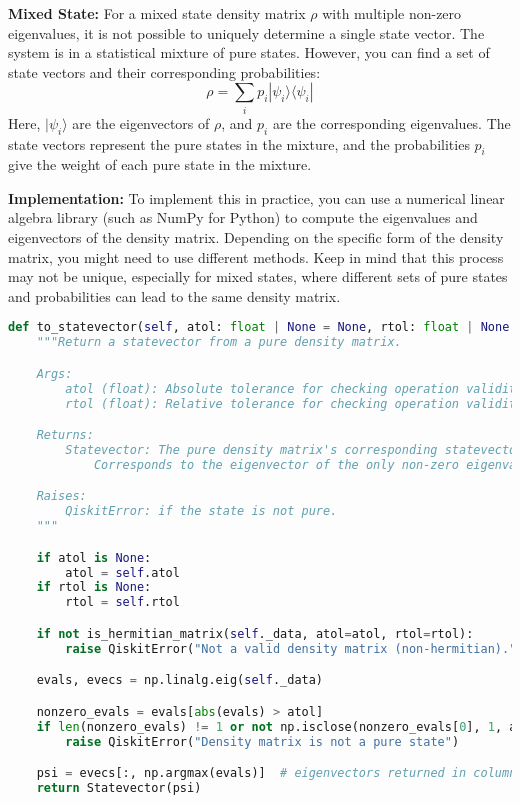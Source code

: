 \documentclass{article}
\begin{document}
\textbf{Mixed State:}
For a mixed state density matrix $\rho$ with multiple non-zero eigenvalues, it is not possible to uniquely determine a single state vector. The system is in a statistical mixture of pure states. However, you can find a set of state vectors and their corresponding probabilities:
\[ \rho = \sum_i p_i |\psi_i\rangle\langle\psi_i| \]
Here, $|\psi_i\rangle$ are the eigenvectors of $\rho$, and $p_i$ are the corresponding eigenvalues. The state vectors represent the pure states in the mixture, and the probabilities $p_i$ give the weight of each pure state in the mixture.

\textbf{Implementation:}
To implement this in practice, you can use a numerical linear algebra library (such as NumPy for Python) to compute the eigenvalues and eigenvectors of the density matrix. Depending on the specific form of the density matrix, you might need to use different methods.
Keep in mind that this process may not be unique, especially for mixed states, where different sets of pure states and probabilities can lead to the same density matrix.

\newpage
\begin{lstlisting}[language=Python]
def to_statevector(self, atol: float | None = None, rtol: float | None = None) -> Statevector:
    """Return a statevector from a pure density matrix.

    Args:
        atol (float): Absolute tolerance for checking operation validity.
        rtol (float): Relative tolerance for checking operation validity.

    Returns:
        Statevector: The pure density matrix's corresponding statevector.
            Corresponds to the eigenvector of the only non-zero eigenvalue.

    Raises:
        QiskitError: if the state is not pure.
    """

    if atol is None:
        atol = self.atol
    if rtol is None:
        rtol = self.rtol

    if not is_hermitian_matrix(self._data, atol=atol, rtol=rtol):
        raise QiskitError("Not a valid density matrix (non-hermitian).")

    evals, evecs = np.linalg.eig(self._data)

    nonzero_evals = evals[abs(evals) > atol]
    if len(nonzero_evals) != 1 or not np.isclose(nonzero_evals[0], 1, atol=atol, rtol=rtol):
        raise QiskitError("Density matrix is not a pure state")

    psi = evecs[:, np.argmax(evals)]  # eigenvectors returned in columns.
    return Statevector(psi)
\end{lstlisting}
\end{document}
